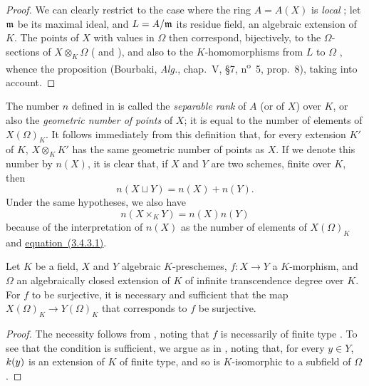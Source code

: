 \begin{proof}
\label{proof-1.6.4.7}
We can clearly restrict to the case where the ring $A=A(X)$ is \emph{local} ;
let $\mathfrak{m}$ be its maximal ideal, and $L=A/\mathfrak{m}$ its residue field, an algebraic extension of $K$.
The points of $X$ with values in $\Omega$ then correspond, bijectively, to the $\Omega$-sections of $X\otimes_K\Omega$ ( and ), and also to the $K$-homomorphisms from $L$ to $\Omega$ , whence the proposition (Bourbaki, \emph{Alg.}, chap.~V, §7, n\textsuperscript{o}~5, prop.~8), taking  into account.
\end{proof}

\begin{env}[6.4.8]
\label{1.6.4.8}
The number $n$ defined in  is called the \emph{separable rank} of $A$ (or of $X$) over $K$, or also the \emph{geometric number of points} of $X$;
it is equal to the number of elements of $X(\Omega)_K$.
It follows immediately from this definition that, for every extension $K'$ of $K$, $X\otimes_K K'$ has the same geometric number of points as $X$.
If we denote this number by $n(X)$, it is clear that, if $X$ and $Y$ are two schemes, finite over $K$, then
\begin{equation*}
    n(X\sqcup Y) = n(X)+n(Y).\tag{6.4.8.1}
\end{equation*}
Under the same hypotheses, we also have
\begin{equation*}
    n(X\times_K Y) = n(X)n(Y)\tag{6.4.8.2}
\end{equation*}
because of the interpretation of $n(X)$ as the number of elements of $X(\Omega)_K$ and \hyperref[1.3.4.3]{equation~(3.4.3.1)}.
\end{env}

\begin{prop}[6.4.9]
\label{1.6.4.9}
Let $K$ be a field, $X$ and $Y$ algebraic $K$-preschemes, $f\colon X\to Y$ a $K$-morphism, and $\Omega$ an algebraically closed extension of $K$ of infinite transcendence degree over $K$.
For $f$ to be surjective, it is necessary and sufficient that the map $X(\Omega)_K\to Y(\Omega)_K$ that corresponds to $f$  be surjective.
\end{prop}

\begin{proof}
\label{proof-1.6.4.9}
The necessity follows from , noting that $f$ is necessarily of finite type .
To see that the condition is sufficient, we argue as in , noting that, for every $y\in Y$, $k(y)$ is an extension of $K$ of finite type, and so is $K$-isomorphic to a subfield of $\Omega$.
\end{proof}

